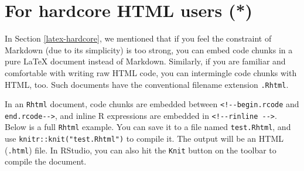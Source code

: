 \documentclass[
  11pt,
]{krantz}
\begin{document}
\hypertarget{html-hardcore}{%
\section{For hardcore HTML users (*)}\label{html-hardcore}}

In Section \ref{latex-hardcore}, we mentioned that if you feel the constraint of Markdown (due to its simplicity) is too strong, you can embed code chunks in a pure LaTeX document instead of Markdown. Similarly, if you are familiar and comfortable with writing raw HTML code, you can intermingle code chunks with HTML, too. Such documents have the conventional filename extension \texttt{.Rhtml}.

In an \texttt{Rhtml} document, code chunks are embedded between \texttt{\textless{}!-\/-begin.rcode} and \texttt{end.rcode-\/-\textgreater{}}, and inline R expressions are embedded in \texttt{\textless{}!-\/-rinline\ -\/-\textgreater{}}. Below is a full \texttt{Rhtml} example. You can save it to a file named \texttt{test.Rhtml}, and use \texttt{knitr::knit("test.Rhtml")} to compile it. The output will be an HTML (\texttt{.html}) file. In RStudio, you can also hit the \texttt{Knit} button on the toolbar to compile the document.
\end{document}
